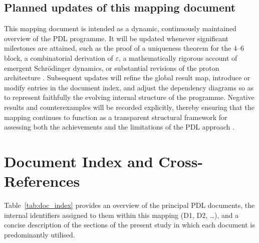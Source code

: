 \documentclass[11pt,a4paper]{article}
\begin{document}
\subsection{Planned updates of this mapping document}
\label{subsec:roadmap_mapping}

This mapping document is intended as a dynamic, continuously maintained overview of the PDL programme. It will be updated whenever significant milestones are attained, such as the proof of a uniqueness theorem for the $4$--$6$ block, a combinatorial derivation of $\varepsilon$, a mathematically rigorous account of emergent Schr\"odinger dynamics, or substantial revisions of the proton architecture \citep{PDL_position}. Subsequent updates will refine the global result map, introduce or modify entries in the document index, and adjust the dependency diagrams so as to represent faithfully the evolving internal structure of the programme. Negative results and counterexamples will be recorded explicitly, thereby ensuring that the mapping continues to function as a transparent structural framework for assessing both the achievements and the limitations of the PDL approach \citep{PDL_position}.

\newpage

\appendix

\section{Document Index and Cross-References}
\label{app:doc_index}

Table~\ref{tab:doc_index} provides an overview of the principal PDL documents, the internal identifiers assigned to them within this mapping (D1, D2, \dots), and a concise description of the sections of the present study in which each document is predominantly utilised.

\setlength{\LTpre}{18pt}
\setlength{\LTpost}{0pt}
\end{document}
